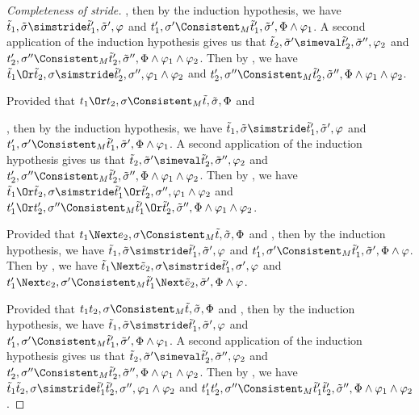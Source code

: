 \begin{proof}[Completeness of stride]
{{   ,
   then by the induction hypothesis, we have $\tilde{t}_1,\tilde{\sigma}\simstride\tilde{t}_1',\tilde{\sigma}',\phi$
   and $t_1',\sigma'\Consistent_M\tilde{t}_1',\tilde{\sigma}',\Phi\land\phi_1$.
   A second application of the induction hypothesis gives us that $\tilde{t}_2,\tilde{\sigma}'\simeval \tilde{t}_2',\tilde{\sigma}'',\phi_2$
   and $t_2',\sigma''\Consistent_M\tilde{t}_2',\tilde{\sigma}'',\Phi\land\phi_1\land\phi_2$.
   Then by , we have $\tilde{t}_1\Or\tilde{t}_2,\sigma\simstride\tilde{t}_2',\sigma'',\phi_1\land\phi_2$
   and $t_2',\sigma''\Consistent_M\tilde{t}_2',\tilde{\sigma}'',\Phi\land\phi_1\land\phi_2$.
   }
  {
  Provided that $t_1\Or t_2,\sigma\Consistent_M \tilde{t},\tilde{\sigma},\Phi$ and

  ,
  then by the induction hypothesis, we have $\tilde{t}_1,\tilde{\sigma}\simstride\tilde{t}_1',\tilde{\sigma}',\phi$
  and $t_1',\sigma'\Consistent_M\tilde{t}_1',\tilde{\sigma}',\Phi\land\phi_1$.
  A second application of the induction hypothesis gives us that $\tilde{t}_2,\tilde{\sigma}'\simeval \tilde{t}_2',\tilde{\sigma}'',\phi_2$
  and $t_2',\sigma''\Consistent_M\tilde{t}_2',\tilde{\sigma}'',\Phi\land\phi_1\land\phi_2$.
  Then by , we have $\tilde{t}_1\Or\tilde{t}_2,\sigma\simstride\tilde{t}_1'\Or\tilde{t}_2',\sigma'',\phi_1\land\phi_2$
  and $t_1'\Or t_2',\sigma''\Consistent_M\tilde{t}_1'\Or \tilde{t}_2',\tilde{\sigma}'',\Phi\land\phi_1\land\phi_2$.
   }
  }

  {

  Provided that $t_1\Next e_2,\sigma\Consistent_M \tilde{t},\tilde{\sigma},\Phi$ and ,
  then by the induction hypothesis, we have $\tilde{t}_1,\tilde{\sigma}\simstride\tilde{t}_1',\tilde{\sigma}',\phi$
  and $t_1',\sigma'\Consistent_M\tilde{t}_1',\tilde{\sigma}',\Phi\land\phi$.
  Then by , we have $\tilde{t}_1\Next\tilde{e}_2,\sigma\simstride\tilde{t}_1',\sigma',\phi$
  and $t_1'\Next e_2,\sigma'\Consistent_M\tilde{t}_1'\Next \tilde{e}_2,\tilde{\sigma}',\Phi\land\phi$.
  }

  {
  Provided that $t_1\And t_2,\sigma\Consistent_M \tilde{t},\tilde{\sigma},\Phi$ and ,
  then by the induction hypothesis, we have $\tilde{t}_1,\tilde{\sigma}\simstride\tilde{t}_1',\tilde{\sigma}',\phi$
  and $t_1',\sigma'\Consistent_M\tilde{t}_1',\tilde{\sigma}',\Phi\land\phi_1$.
  A second application of the induction hypothesis gives us that $\tilde{t}_2,\tilde{\sigma}'\simeval \tilde{t}_2',\tilde{\sigma}'',\phi_2$
  and $t_2',\sigma''\Consistent_M\tilde{t}_2',\tilde{\sigma}'',\Phi\land\phi_1\land\phi_2$.
  Then by , we have $\tilde{t}_1\And\tilde{t}_2,\sigma\simstride\tilde{t}_1'\And\tilde{t}_2',\sigma'',\phi_1\land\phi_2$
  and $t_1'\And t_2',\sigma''\Consistent_M\tilde{t}_1'\And \tilde{t}_2',\tilde{\sigma}'',\Phi\land\phi_1\land\phi_2$.

  }
\end{proof}

